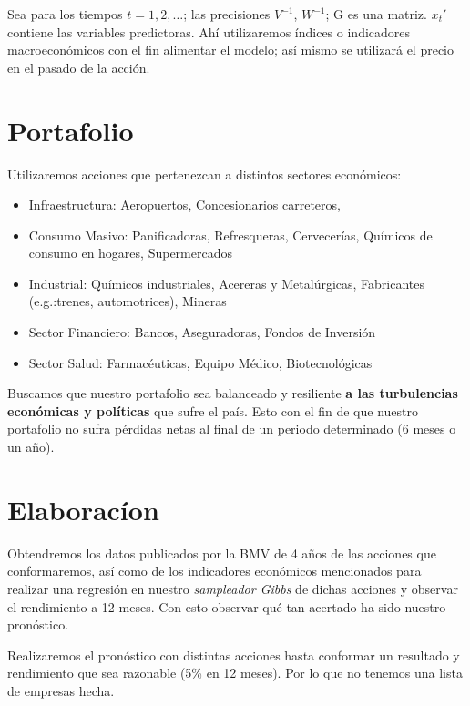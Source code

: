 \documentclass[12pt,reqno,a4paper]{article}
\begin{document}
\begin{multicols}{2}
		Sea para los tiempos $t=1,2,\dots$; las precisiones $V^{-1}$, $W^{-1}$; G es una matriz. $x_t'$ contiene las variables predictoras. Ah\'i utilizaremos \'indices o indicadores macroecon\'omicos con el fin alimentar el modelo; as\'i mismo se utilizar\'a el precio en el pasado de la acci\'on.
	
		\section{Portafolio}
		
		Utilizaremos acciones que pertenezcan a distintos sectores econ\'omicos:
		
		\begin{itemize}
			\item Infraestructura: Aeropuertos, Concesionarios carreteros, 
			\item Consumo Masivo: Panificadoras, Refresqueras, Cervecer\'ias, Qu\'imicos de consumo en hogares, Supermercados
			\item Industrial: Qu\'imicos industriales, Acereras y Metal\'urgicas, Fabricantes (e.g.:trenes, automotrices), Mineras
			\item Sector Financiero: Bancos, Aseguradoras, Fondos de Inversi\'on
			\item Sector Salud: Farmac\'euticas, Equipo M\'edico, Biotecnol\'ogicas
		\end{itemize}
	
		Buscamos que nuestro portafolio sea balanceado y resiliente \textbf{a las turbulencias econ\'omicas y pol\'iticas} que sufre el pa\'is. Esto con el fin de que nuestro portafolio no sufra p\'erdidas netas al final de un periodo determinado (6 meses o un año).
		
		\section{Elaborac\'ion}
		
		Obtendremos los datos publicados por la BMV de 4 años de las acciones que conformaremos, as\'i como de los indicadores econ\'omicos mencionados para realizar una regresi\'on en nuestro \textit{sampleador Gibbs} de dichas acciones y observar el rendimiento a 12 meses. Con esto observar qu\'e tan acertado ha sido nuestro pron\'ostico.
		
		Realizaremos el pron\'ostico con distintas acciones hasta conformar un resultado y rendimiento que sea razonable (5\% en 12 meses). Por lo que no tenemos una lista de empresas hecha.
		
		
	\end{multicols}
\end{document}
